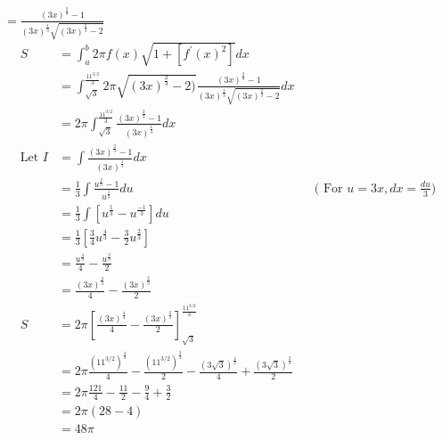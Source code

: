 \documentclass{article}
\begin{document}
{    $
    = 
    \frac{
        (3x)^{\frac{2}{3}} - 1
    }{
        (3x)^{\frac{1}{3}} \sqrt{(3x)^{\frac{2}{3}} - 2}
    }
    $\\

    \begin{align*}
        S & = \int_a^b{2\pi f(x) \sqrt{1+[f^{\prime}(x)^2]}} dx\\
        & = \int_{\sqrt{3}}^{\frac{11^{3/2}}{3}}{2\pi 
            \sqrt{(3x)^{\frac{2}{3}} - 2)}
            \frac{
                (3x)^{\frac{2}{3}} - 1
            }{
                (3x)^{\frac{1}{3}} \sqrt{(3x)^{\frac{2}{3}} - 2}
            }        
            } dx\\
        & = 2\pi \int_{\sqrt{3}}^{\frac{11^{3/2}}{3}}{
            \frac{
                (3x)^{\frac{2}{3}} - 1
            }{
                (3x)^{\frac{1}{3}}
            }        
            } dx\\
        \text{Let } I & = \int{
            \frac{
                (3x)^{\frac{2}{3}} - 1
            }{
                (3x)^{\frac{1}{3}}
            }        
            } dx\\
        & = \frac{1}{3} \int{
            \frac{
                u^{\frac{2}{3}} - 1
            }{
                u^{\frac{1}{3}}
            }        
            } du
            && \text{(
                For $u=3x, dx = \frac{du}{3}$
            )}\\
        & = \frac{1}{3} \int{
            [u^{\frac{1}{3}}
            - u^{\frac{-1}{3}}]
            } du\\
        & = \frac{1}{3} [
            \frac{3}{4} u^{\frac{4}{3}}
            - \frac{3}{2} u^{\frac{2}{3}}
            ]\\
        & = \frac{u^{\frac{4}{3}}}{4} 
            - \frac{u^{\frac{2}{3}}}{2} \\
        & = \frac{(3x)^{\frac{4}{3}}}{4} 
            - \frac{(3x)^{\frac{2}{3}}}{2} \\
        S & = 2\pi \left[
            \frac{(3x)^{\frac{4}{3}}}{4} 
            - \frac{(3x)^{\frac{2}{3}}}{2}
        \right]_{\sqrt{3}}^{\frac{11^{3/2}}{3}}\\
        & = 2\pi \frac{(11^{3/2})^{\frac{4}{3}}}{4} 
            - \frac{(11^{3/2})^{\frac{2}{3}}}{2}
            - \frac{(3\sqrt{3})^{\frac{4}{3}}}{4} 
            + \frac{(3\sqrt{3})^{\frac{2}{3}}}{2}\\
        & = 2\pi \frac{121}{4} 
            - \frac{11}{2}
            - \frac{9}{4} 
            + \frac{3}{2}\\
        & = 2\pi(28 - 4)\\
        & = \boxed{48\pi}\\
    \end{align*}
}
\end{document}
